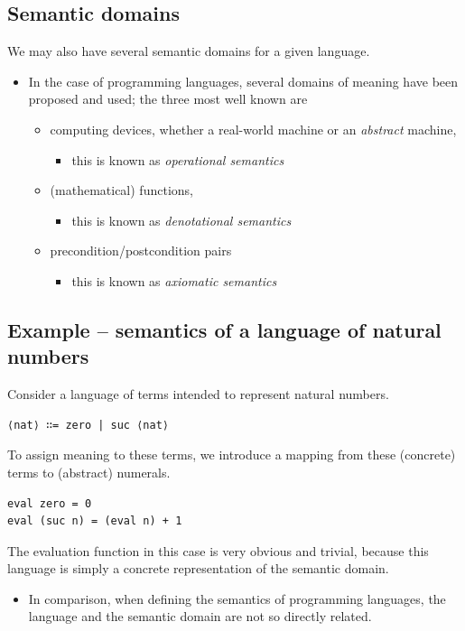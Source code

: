 \documentclass[11pt]{article}
\theoremstyle{definition}
\begin{document}
\subsection{Semantic domains}
\label{sec:orgce55932}
We may also have several semantic domains for a given language.
\begin{itemize}
\item In the case of programming languages,
several domains of meaning have been proposed and used;
the three most well known are
\begin{itemize}
\item computing devices, whether a real-world machine or an \emph{abstract} machine,
\begin{itemize}
\item this is known as \emph{operational semantics}
\end{itemize}
\item (mathematical) functions,
\begin{itemize}
\item this is known as \emph{denotational semantics}
\end{itemize}
\item precondition/postcondition pairs
\begin{itemize}
\item this is known as \emph{axiomatic semantics}
\end{itemize}
\end{itemize}
\end{itemize}

\subsection{Example – semantics of a language of natural numbers}
\label{sec:orge24e1fa}
Consider a language of terms intended to represent
natural numbers.
\begin{verbatim}
⟨nat⟩ ∷= zero | suc ⟨nat⟩ 
\end{verbatim}

To assign meaning to these terms,
we introduce a mapping from these (concrete) terms
to (abstract) numerals.
\begin{verbatim}
eval zero = 0
eval (suc n) = (eval n) + 1
\end{verbatim}

The evaluation function in this case is very obvious and trivial,
because this language is simply a concrete representation
of the semantic domain.
\begin{itemize}
\item In comparison, when defining the semantics of programming languages,
the language and the semantic domain are not so directly related.
\end{itemize}
\end{document}

